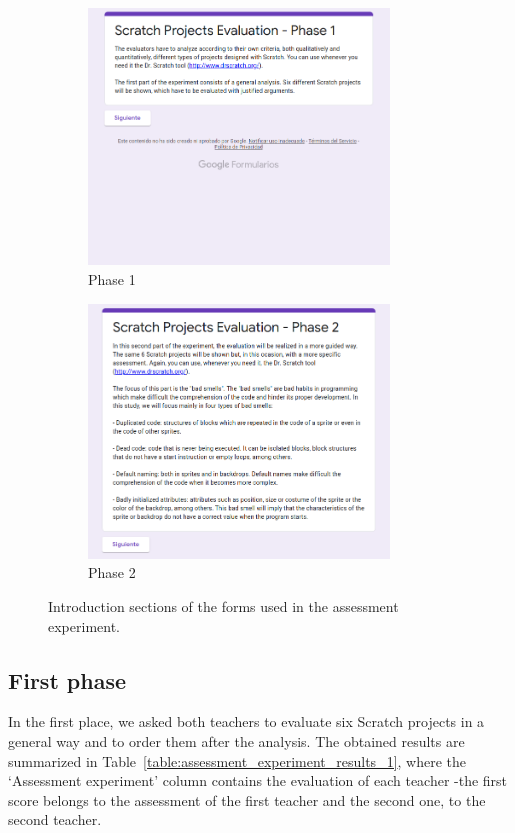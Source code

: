\begin{figure}
    \begin{subfigure}{.5\textwidth}
    \centering
    \includegraphics[width=8cm]{img/Introduction_phase_1.png}
    \caption{Phase 1}
    \label{subfig:introduction_phase_1}
  \end{subfigure}
  \begin{subfigure}{.5\textwidth}
    \centering
    \includegraphics[width=8cm]{img/Introduction_phase_2.png}
    \caption{Phase 2}
    \label{subfig:introduction_phase_2}
  \end{subfigure}
    \caption{Introduction sections of the forms used in the assessment experiment.}
    \label{fig:introduction_sections}
\end{figure}



\subsection{First phase}
\label{subsec:first_phase_experiment}

In the first place, we asked both teachers to evaluate six Scratch projects in a general way and to order them after the analysis. The obtained results are summarized in Table~\ref{table:assessment_experiment_results_1}, where the `Assessment experiment' column contains the evaluation of each teacher -the first score belongs to the assessment of the first teacher and the second one, to the second teacher. 

